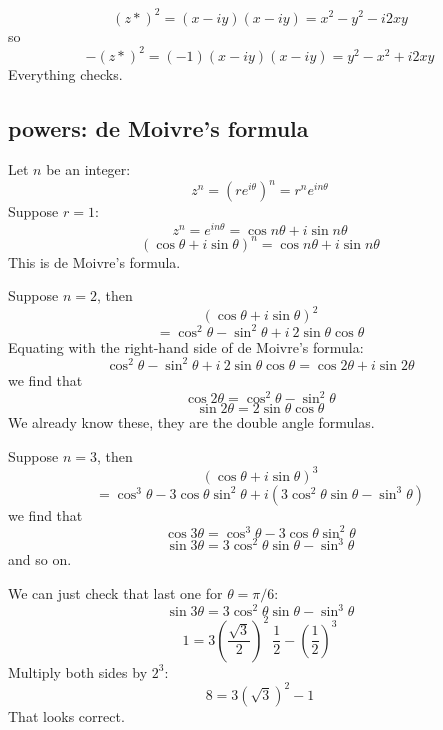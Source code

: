 \documentclass[11pt, oneside]{article}
\begin{document}
\[ (z*)^2 = (x - iy)(x - iy) = x^2 - y^2 - i2xy \]
so
\[ -(z*)^2 = (-1)(x - iy)(x - iy) = y^2 - x^2 + i2xy \]
Everything checks.

\subsection*{powers:  de Moivre's formula}
Let $n$ be an integer:
\[ z^n = (re^{i\theta})^n = r^n e^{in\theta} \]
Suppose $r=1$:
\[ z^n = e^{in\theta} = \cos n \theta + i \sin n \theta \]
\[ (\cos \theta + i \sin \theta)^n = \cos n \theta + i \sin n \theta \]
This is de Moivre's formula.

Suppose $n=2$, then
\[ (\cos \theta + i \sin \theta)^2 \]
\[ = \cos^2 \theta - \sin^2 \theta + i\ 2 \sin \theta \cos \theta \]
Equating with the right-hand side of de Moivre's formula:
\[ \cos^2 \theta - \sin^2 \theta + i\ 2 \sin \theta \cos \theta = \cos 2 \theta + i \sin 2 \theta \]
we find that
\[ \cos 2 \theta = \cos^2 \theta - \sin^2 \theta \]
\[ \sin 2 \theta = 2 \sin \theta \cos \theta \]
We already know these, they are the double angle formulas.

Suppose $n=3$, then
\[ (\cos \theta + i \sin \theta)^3 \]
\[ = \cos^3 \theta - 3 \cos \theta \sin^2 \theta + i (3 \cos^2 \theta \sin \theta - \sin^3 \theta) \]
we find that
\[ \cos 3 \theta =\cos^3 \theta - 3 \cos \theta \sin^2 \theta \]
\[ \sin 3 \theta = 3 \cos^2 \theta \sin \theta - \sin^3 \theta \]
and so on.

We can just check that last one for $\theta = \pi/6$:
\[ \sin 3 \theta = 3 \cos^2 \theta \sin \theta - \sin^3 \theta \]
\[ 1 = 3 (\frac{\sqrt{3}}{2})^2 \ \frac{1}{2} - (\frac{1}{2})^3 \]
Multiply both sides by $2^3$:
\[ 8 = 3 (\sqrt{3})^2 - 1 \]
That looks correct.
\end{document}
